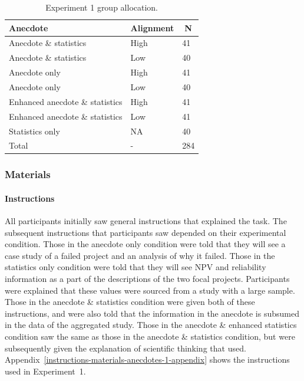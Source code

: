 \documentclass[a4paper, nobind, dvipsnames]{templates/ociamthesis}
\theoremstyle{definition}
\theoremstyle{definition}
\theoremstyle{definition}
\theoremstyle{definition}
\theoremstyle{remark}
\begin{document}
\begin{table}[tbp]

\begin{center}
\begin{threeparttable}

\caption{\label{tab:condition-allocation-anecdotes-1}Experiment 1 group allocation.}

\begin{tabular}{lll}
\toprule
Anecdote & \multicolumn{1}{c}{Alignment} & \multicolumn{1}{c}{N}\\
\midrule
Anecdote \& statistics & High & 41\\
Anecdote \& statistics & Low & 40\\
Anecdote only & High & 41\\
Anecdote only & Low & 40\\
Enhanced anecdote \& statistics & High & 41\\
Enhanced anecdote \& statistics & Low & 41\\
Statistics only & NA & 40\\
Total & - & 284\\
\bottomrule
\end{tabular}

\end{threeparttable}
\end{center}

\end{table}

\hypertarget{materials-anecdotes-1}{%
\subsubsection{Materials}\label{materials-anecdotes-1}}

\hypertarget{instructions-materials-anecdotes-1}{%
\paragraph{Instructions}\label{instructions-materials-anecdotes-1}}

All participants initially saw general instructions that explained the task. The
subsequent instructions that participants saw depended on their experimental
condition. Those in the anecdote only condition were told that they will see a
case study of a failed project and an analysis of why it failed. Those in the
statistics only condition were told that they will see NPV and reliability
information as a part of the descriptions of the two focal projects.
Participants were explained that these values were sourced from a study with a
large sample. Those in the anecdote \& statistics condition were given both of
these instructions, and were also told that the information in the anecdote is
subsumed in the data of the aggregated study. Those in the anecdote \& enhanced
statistics condition saw the same as those in the anecdote \& statistics
condition, but were subsequently given the explanation of scientific thinking
that \textcite{wainberg2018} used.
Appendix~\ref{instructions-materials-anecdotes-1-appendix} shows the
instructions used in Experiment~1.
\end{document}
